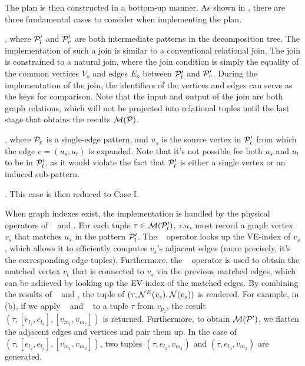 The plan is then constructed in a bottom-up manner. As shown in , there are three fundamental cases to consider when implementing the plan.

, where $\mathcal{P}_l'$ and $\mathcal{P}'_r$ are both intermediate patterns in the decomposition tree. The implementation of such a join is similar to a conventional relational join. The join is constrained to a natural join, where the join condition is simply the equality of the common vertices $V_o$ and edges $E_o$ between $\mathcal{P}_l'$ and $\mathcal{P}_r'$. During the implementation of the join, the identifiers of the vertices and edges can serve as the keys for comparison. Note that the input and output of the join are both graph relations, which will not
be projected into relational tuples until the last stage that obtains the results $\mathcal{M}(\mathcal{P})$.

, where $\mathcal{P}_e$ is a single-edge pattern, and $u_s$ is the source vertex in $\mathcal{P}'_l$ from which the edge $e = (u_s, u_t)$ is expanded. Note that it's not possible for both $u_s$ and $u_t$ to be in $\mathcal{P}'_l$, as it would violate the fact that $\mathcal{P}'_l$ is either a single vertex or an induced sub-pattern.

.
This case is then reduced to Case I. %

When graph indexes exist, the implementation is handled by the physical operators of \expandedge~ and \getvertex. For each tuple $\tau \in \mathcal{M}(\mathcal{P}'_l)$, $\tau.u_s$ must record a graph vertex $v_s$ that matches $u_s$ in the pattern $\mathcal{P}'_l$. The \expandedge~ operator looks up the VE-index of $v_s$, which allows it to efficiently computes $v_s$'s adjacent edges (more precisely, it's the corresponding edge tuples). Furthermore, the \getvertex~ operator is used to obtain the matched vertex $v_t$ that is connected to $v_s$ via the previous matched edges, which can be achieved by looking up the EV-index of the matched edges.
By combining the results of \expandedge~ and \getvertex, the tuple of $(\tau, {\mathcal{N}}^E(v_s), {\mathcal{N}}(v_s))$ is rendered. For example, in (b), if we apply \expandedge~ and \getvertex~ to a tuple $\tau$ from $v_{p_2}$, the result $(\tau, [e_{l_2}, e_{l_3}], [v_{m_1}, v_{m_2}])$ is returned.
Furthermore, to obtain $\mathcal{M}(\mathcal{P}')$, we flatten the adjacent edges and vertices and pair them up. In the case of $(\tau, [e_{l_2}, e_{l_3}], [v_{m_1}, v_{m_2}])$, two tuples $(\tau, e_{l_2}, v_{m_1})$ and $(\tau, e_{l_3}, v_{m_2})$ are generated.

